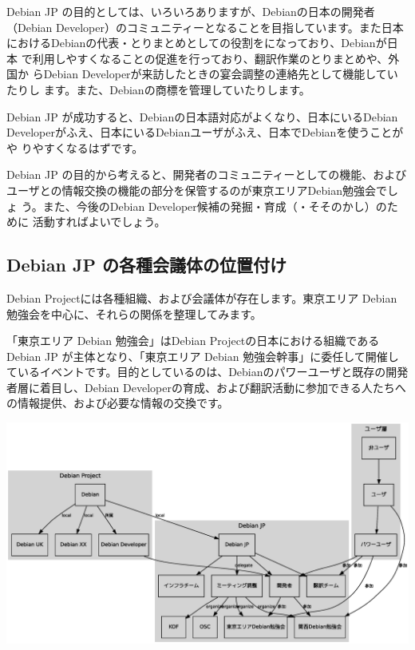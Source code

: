 \documentclass[mingoth,a4paper]{jsarticle}
\begin{document}
Debian JP の目的としては、いろいろありますが、Debianの日本の開発者
（Debian Developer）のコミュニティーとなることを目指しています。また日本
におけるDebianの代表・とりまとめとしての役割をになっており、Debianが日本
で利用しやすくなることの促進を行っており、翻訳作業のとりまとめや、外国か
らDebian Developerが来訪したときの宴会調整の連絡先として機能していたりし
ます。また、Debianの商標を管理していたりします。



Debian JP が成功すると、Debianの日本語対応がよくなり、日本にいるDebian
Developerがふえ、日本にいるDebianユーザがふえ、日本でDebianを使うことがや
りやすくなるはずです。

Debian JP の目的から考えると、開発者のコミュニティーとしての機能、および
ユーザとの情報交換の機能の部分を保管するのが東京エリアDebian勉強会でしょ
う。また、今後のDebian Developer候補の発掘・育成（・そそのかし）のために
活動すればよいでしょう。




\subsection{Debian JP の各種会議体の位置付け}

Debian Projectには各種組織、および会議体が存在します。東京エリア Debian
勉強会を中心に、それらの関係を整理してみます。

「東京エリア Debian 勉強会」はDebian Projectの日本における組織である
Debian JP が主体となり、「東京エリア Debian 勉強会幹事」に委任して開催し
ているイベントです。目的としているのは、Debianのパワーユーザと既存の開発
者層に着目し、Debian Developerの育成、および翻訳活動に参加できる人たちへ
の情報提供、および必要な情報の交換です。

\includegraphics[width=1\hsize]{image200712/debianmeetinganddebianjp.eps}
\end{document}
